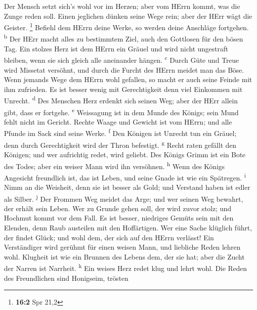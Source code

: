  Der Mensch setzt sich's wohl vor im Herzen; aber vom
HErrn kommt, was die Zunge reden soll.  Einen jeglichen
dünken seine Wege rein; aber der HErr wägt die Geister. \footnote{\textbf{16:2}
  Spr 21,2}  Befiehl dem HErrn deine Werke, so werden
deine Anschläge fortgehen. \textsuperscript{b}  Der HErr
macht alles zu bestimmtem Ziel, auch den Gottlosen für den bösen Tag.
 Ein stolzes Herz ist dem HErrn ein Gräuel und wird nicht
ungestraft bleiben, wenn sie sich gleich alle aneinander hängen.
\textsuperscript{c}  Durch Güte und Treue wird Missetat
versöhnt, und durch die Furcht des HErrn meidet man das Böse.
 Wenn jemands Wege dem HErrn wohl gefallen, so macht er
auch seine Feinde mit ihm zufrieden.  Es ist besser wenig
mit Gerechtigkeit denn viel Einkommen mit Unrecht. \textsuperscript{d}
 Des Menschen Herz erdenkt sich seinen Weg; aber der HErr
allein gibt, dass er fortgehe. \textsuperscript{e} 
Weissagung ist in dem Munde des Königs; sein Mund fehlt nicht im
Gericht.  Rechte Waage und Gewicht ist vom HErrn; und
alle Pfunde im Sack sind seine Werke. \textsuperscript{f}
 Den Königen ist Unrecht tun ein Gräuel; denn durch
Gerechtigkeit wird der Thron befestigt. \textsuperscript{g}
 Recht raten gefällt den Königen; und wer aufrichtig
redet, wird geliebt.  Des Königs Grimm ist ein Bote des
Todes; aber ein weiser Mann wird ihn versöhnen. \textsuperscript{h}
 Wenn des Königs Angesicht freundlich ist, das ist Leben,
und seine Gnade ist wie ein Spätregen. \textsuperscript{i}
 Nimm an die Weisheit, denn sie ist besser als Gold; und
Verstand haben ist edler als Silber. \textsuperscript{j} 
Der Frommen Weg meidet das Arge; und wer seinen Weg bewahrt, der erhält
sein Leben.  Wer zu Grunde gehen soll, der wird zuvor
stolz; und Hochmut kommt vor dem Fall.  Es ist besser,
niedriges Gemüts sein mit den Elenden, denn Raub austeilen mit den
Hoffärtigen.  Wer eine Sache klüglich führt, der findet
Glück; und wohl dem, der sich auf den HErrn verlässt! 
Ein Verständiger wird gerühmt für einen weisen Mann, und liebliche Reden
lehren wohl.  Klugheit ist wie ein Brunnen des Lebens
dem, der sie hat; aber die Zucht der Narren ist Narrheit.
\textsuperscript{k}  Ein weises Herz redet klug und lehrt
wohl.  Die Reden des Freundlichen sind Honigseim, trösten
